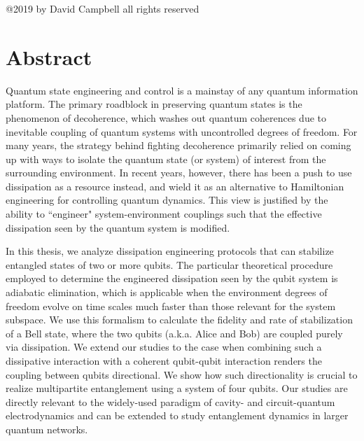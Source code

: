 \documentclass[12pt,letterpaper]{report}
\numberwithin{equation}{section}
\begin{document}
   \thispagestyle{empty}


\vspace*{\fill}
\begin{center}

@2019 by David Campbell all rights reserved 
\end{center}
\vspace*{\fill}

\clearpage



\clearpage
%
\chapter*{\label{sec:abstract}Abstract}
\setcounter{page}{4}
%
Quantum state engineering and control is a mainstay of any quantum information platform. The primary roadblock in preserving quantum states is the phenomenon of decoherence, which washes out quantum coherences due to inevitable coupling of quantum systems with uncontrolled degrees of freedom. For many years, the strategy behind fighting decoherence primarily relied on coming up with ways to isolate the quantum state (or system) of interest from the surrounding environment. In recent years, however, there has been a push to use dissipation as a resource instead, and wield it as an alternative to Hamiltonian engineering for controlling quantum dynamics. This view is justified by the ability to ``engineer" system-environment couplings such that the effective dissipation seen by the quantum system is modified. 
%
\par
%
In this thesis, we analyze dissipation engineering protocols that can stabilize entangled states of two or more qubits. The particular theoretical procedure employed to determine the engineered dissipation seen by the qubit system is adiabatic elimination, which is applicable when the environment degrees of freedom evolve on time scales much faster than those relevant for the system subspace. We use this formalism to calculate the fidelity and rate of stabilization of a Bell state, where the two qubits (a.k.a. Alice and Bob) are coupled purely via dissipation. We extend our studies to the case when combining such a dissipative interaction with a coherent qubit-qubit interaction renders the coupling between qubits directional. We show how such directionality is crucial to realize multipartite entanglement using a system of four qubits. Our studies are directly relevant to the widely-used paradigm of cavity- and circuit-quantum electrodynamics and can be extended to study entanglement dynamics in larger quantum networks.
%
\end{document}
